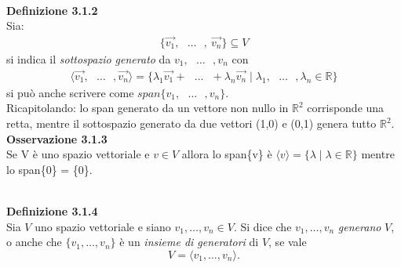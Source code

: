 \documentclass{article}
\begin{document}
\vspace{1em}
\\
\textbf{Definizione 3.1.2}
\\ Sia: 
\begin{align*}
   \{ \vec{v_1}, \text{ } \dots \text{ }, \ \vec{v_n} \} \subseteq V
\end{align*}
si indica il \textit{sottospazio generato} da $v_1, \text{ } \dots \text{ }, v_n$ con 
\begin{align*}
  \langle \vec{v_1}, \text{ } \dots \text{ }, \vec{v_n} \rangle = \{\lambda_1 \vec{v_1} + \text{ } \dots \text{ } + \lambda_n \vec{v_n} \mid \lambda_1, \text{ } \dots \text{ }, \lambda_n \in \mathbb{R}\}
\end{align*}
si può anche scrivere come $span\{v_1, \text{ } \dots \text{ }, v_n\}$.
\\ Ricapitolando: lo span generato da un vettore non nullo in $\mathbb{R}^2$ corrisponde una retta, mentre il sottospazio generato da due vettori (1,0) e (0,1) genera tutto $\mathbb{R}^2$.
\\ \textbf{Osservazione 3.1.3}
\\ Se V è uno spazio vettoriale e $v \in V$ allora lo span\{v\} è $\langle v \rangle = \{\lambda \mid \lambda \in \mathbb{R}\}$ mentre lo span\{0\} = \{0\}. 

\vspace{5px}
\textbf{\\ Definizione 3.1.4}  
\\ Sia \(V\) uno spazio vettoriale e siano \(v_1, \dots, v_n \in V\).  
Si dice che \(v_1, \dots, v_n\) \textit{generano} \(V\), o anche che \(\{v_1, \dots, v_n\}\) è un \textit{insieme di generatori} di \(V\), se vale \[ V = \langle v_1, \dots, v_n \rangle. \]
\end{document}
